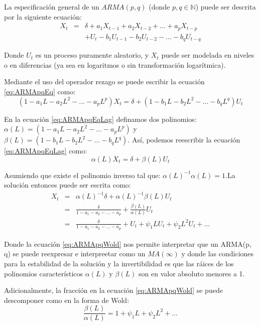 \documentclass[
]{book}
\begin{document}
La especificación general de un \(ARMA(p, q)\) (donde \(p, q \in \mathbb{N}\)) puede ser descrita por la siguiente ecuación:
\begin{eqnarray}
    X_t & = & \delta + a_1 X_{t - 1} + a_2 X_{t - 2} + \ldots + a_p X_{t - p} \nonumber \\
    &   & + U_t - b_1 U_{t - 1} - b_2  U_{t - 2} - \ldots - b_q  U_{t - q}
    \label{eq:ARMApqEq}
\end{eqnarray}

Donde \(U_t\) es un proceso puramente aleatorio, y \(X_t\) puede ser modelada en niveles o en diferencias (ya sea en logaritmos o sin
transformación logarítmica).

Mediante el uso del operador rezago se puede escribir la ecuación \eqref{eq:ARMApqEq} como:
\begin{equation}
    (1 - a_1 L - a_2 L^2 - \ldots - a_p L^p) X_t = \delta + (1 - b_1 L - b_2 L^2 - \ldots - b_q L^q) U_t 
    \label{eq:ARMApqEqLag}
\end{equation}

En la ecuación \eqref{eq:ARMApqEqLag} definamos dos polinomios: \(\alpha(L) = (1 - a_1 L - a_2 L^2 - \ldots - a_p L^p)\) y \(\beta(L) = (1 - b_1 L - b_2 L^2 - \ldots - b_q L^q)\). Así, podemos reescribir la ecuación \eqref{eq:ARMApqEqLag} como:
\begin{equation}
    \alpha(L) X_t = \delta + \beta(L) U_t 
\end{equation}

Asumiendo que existe el polinomio inverso tal que: \(\alpha(L)^{-1}\alpha(L) = 1\).La solución entonces puede ser escrita como:
\begin{eqnarray}
    X_t & = & \alpha(L)^{-1} \delta + \alpha(L)^{-1} \beta(L) U_t \nonumber \\
    & = & \frac{\delta}{1 - a_1 - a_2 - \ldots - a_p} + \frac{\beta(L)}{\alpha(L)} U_t \nonumber \\
    & = & \frac{\delta}{1 - a_1 - a_2 - \ldots - a_p} + U_t + \psi_1 L U_t + \psi_2 L^2 U_t + \ldots
    \label{eq:ARMApqWold}
\end{eqnarray}

Donde la ecuación \eqref{eq:ARMApqWold} nos permite interpretar que un ARMA(p, q) se puede reexpresar e interpreetar como un \(MA(\infty)\) y donde las condiciones para la estabilidad de la solución y la invertibilidad es que las ráices de los polinomios característicos \(\alpha(L)\) y \(\beta(L)\) son en valor absoluto menores a 1.

Adicionalmente, la fracción en la ecuación \eqref{eq:ARMApqWold} se puede descomponer como en la forma de Wold:
\begin{equation}
    \frac{\beta(L)}{\alpha(L)} = 1 + \psi_1 L + \psi_2 L^2 + \ldots
\end{equation}
\end{document}

